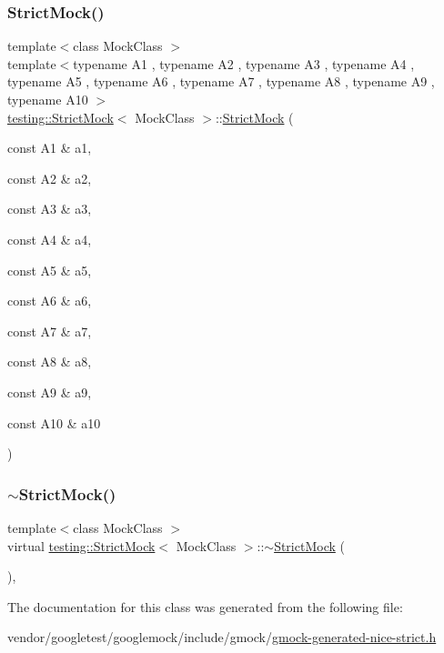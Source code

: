 \subsubsection{\texorpdfstring{Strict\+Mock()}{StrictMock()}\hspace{0.1cm}{\footnotesize\ttfamily [11/11]}}
{\footnotesize\ttfamily template$<$class Mock\+Class $>$ \\
template$<$typename A1 , typename A2 , typename A3 , typename A4 , typename A5 , typename A6 , typename A7 , typename A8 , typename A9 , typename A10 $>$ \\
\hyperlink{classtesting_1_1_strict_mock}{testing\+::\+Strict\+Mock}$<$ Mock\+Class $>$\+::\hyperlink{classtesting_1_1_strict_mock}{Strict\+Mock} (\begin{DoxyParamCaption}\item[{const A1 \&}]{a1,  }\item[{const A2 \&}]{a2,  }\item[{const A3 \&}]{a3,  }\item[{const A4 \&}]{a4,  }\item[{const A5 \&}]{a5,  }\item[{const A6 \&}]{a6,  }\item[{const A7 \&}]{a7,  }\item[{const A8 \&}]{a8,  }\item[{const A9 \&}]{a9,  }\item[{const A10 \&}]{a10 }\end{DoxyParamCaption})\hspace{0.3cm}{\ttfamily [inline]}}

\mbox{\label{classtesting_1_1_strict_mock_ae22ba62955775b26c88937ee225db528}} 
\subsubsection{\texorpdfstring{$\sim$\+Strict\+Mock()}{~StrictMock()}}
{\footnotesize\ttfamily template$<$class Mock\+Class $>$ \\
virtual \hyperlink{classtesting_1_1_strict_mock}{testing\+::\+Strict\+Mock}$<$ Mock\+Class $>$\+::$\sim$\hyperlink{classtesting_1_1_strict_mock}{Strict\+Mock} (\begin{DoxyParamCaption}{ }\end{DoxyParamCaption})\hspace{0.3cm}{\ttfamily [inline]}, {\ttfamily [virtual]}}



The documentation for this class was generated from the following file\+:\begin{DoxyCompactItemize}
\item 
vendor/googletest/googlemock/include/gmock/\hyperlink{gmock-generated-nice-strict_8h}{gmock-\/generated-\/nice-\/strict.\+h}\end{DoxyCompactItemize}
